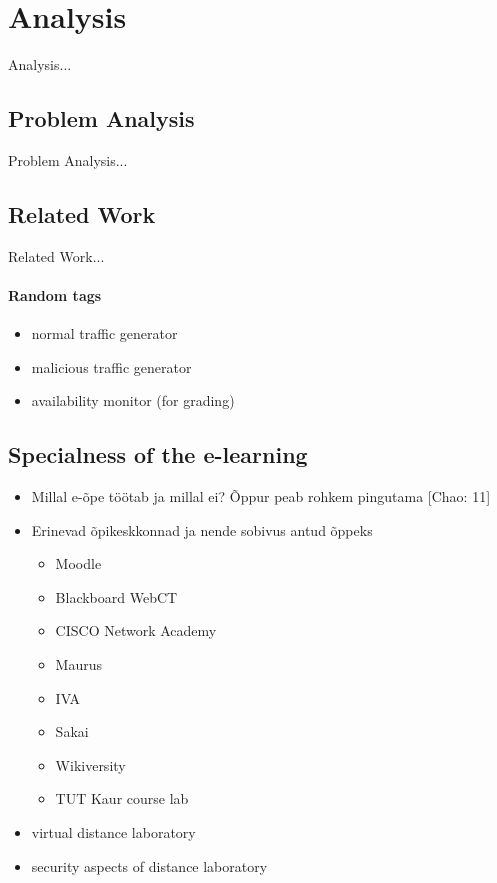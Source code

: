 \chapter{Analysis}
\label{analysis}
Analysis...


\section{Problem Analysis}
\label{Problem Analysis}
Problem Analysis...

\section{Related Work}
\label{Related Work}
Related Work...




\subsubsection{Random tags}
\begin{itemize}
	\item normal traffic generator
	\item malicious traffic generator
	\item availability monitor (for grading)
\end{itemize}

\section{Specialness of the e-learning}
\begin{itemize}
	\item Millal e-õpe töötab ja millal ei? Õppur peab rohkem pingutama [Chao: 11]
	\item Erinevad õpikeskkonnad ja nende sobivus antud õppeks
		\begin{itemize}
			\item Moodle
			\item Blackboard WebCT
			\item CISCO Network Academy
			\item Maurus
			\item IVA
			\item Sakai
			\item Wikiversity
			\item TUT Kaur course lab
		\end{itemize}
	\item virtual distance laboratory
	\item security aspects of distance laboratory
\end{itemize}

